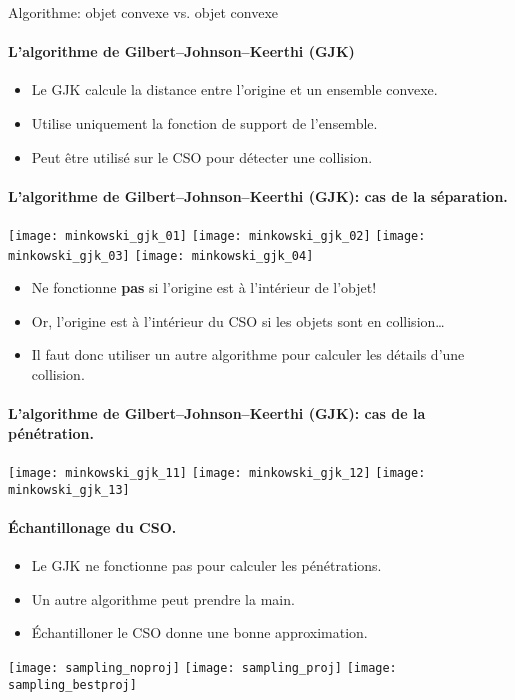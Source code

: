 \begin{frame}{Algorithme: objet convexe vs. objet convexe}
     {
        \framesubtitle{L’algorithme de Gilbert–Johnson–Keerthi (GJK)}
        \begin{itemize}
            \item Le GJK calcule la distance entre l’origine et un ensemble convexe.
            \item Utilise uniquement la fonction de support de l’ensemble.
            \item Peut être utilisé sur le CSO pour détecter une collision.
        \end{itemize}
    }
     {
        \framesubtitle{L’algorithme de Gilbert–Johnson–Keerthi (GJK): cas de la séparation.}
    }
     {
        \centering
        \texttt{[image: minkowski\_gjk\_01]}
    }
     {
        \centering
        \texttt{[image: minkowski\_gjk\_02]}
    }
     {
        \centering
        \texttt{[image: minkowski\_gjk\_03]}
    }
     {
        \centering
        \texttt{[image: minkowski\_gjk\_04]}
    }
     {
        \begin{itemize}
            \item Ne fonctionne \textbf{pas} si l’origine est à l’intérieur de
                l’objet!
            \item Or, l’origine est à l’intérieur du CSO si les objets sont en
                collision…
            \item Il faut donc utiliser un autre algorithme pour calculer les
                détails d’une collision.
        \end{itemize}
    }
     {
        \framesubtitle{L’algorithme de Gilbert–Johnson–Keerthi (GJK): cas de la pénétration.}
    }
     {
        \centering
        \texttt{[image: minkowski\_gjk\_11]}
    }
     {
        \centering
        \texttt{[image: minkowski\_gjk\_12]}
    }
     {
        \centering
        \texttt{[image: minkowski\_gjk\_13]}
    }
     {
        \framesubtitle{Échantillonage du CSO.}
    }
     {
        \begin{itemize}
            \item Le GJK ne fonctionne pas pour calculer les pénétrations.
            \item Un autre algorithme peut prendre la main.
            \item Échantilloner le CSO donne une bonne approximation.
        \end{itemize}
    }
     {
        \centering
        \texttt{[image: sampling\_noproj]}
    }
     {
        \centering
        \texttt{[image: sampling\_proj]}
    }
     {
        \centering
        \texttt{[image: sampling\_bestproj]}
    }
\end{frame}

